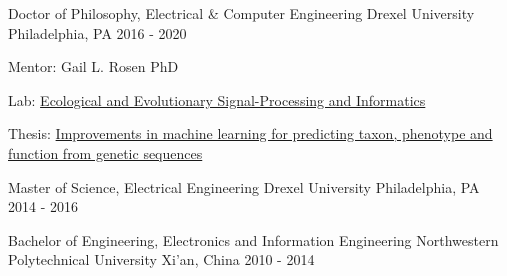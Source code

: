 

\begin{cventries}

  \cventry
    {Doctor of Philosophy, Electrical \& Computer Engineering} %
    {Drexel University} %
    {Philadelphia, PA} %
    {2016 - 2020} %
    {
      \begin{cvitems} %
         \item Mentor: Gail L. Rosen PhD
         \item Lab: \href{http://drexeleesi.com/}{Ecological and Evolutionary Signal-Processing and Informatics}
	 \item Thesis: \href{https://drexel.primo.exlibrisgroup.com/permalink/01DRXU_INST/1aqopv8/alma991014833048604721}{Improvements in machine learning for predicting taxon, phenotype and function from genetic sequences}
      \end{cvitems}
    }
    
  \cventry
    {Master of Science, Electrical Engineering} %
    {Drexel University} %
    {Philadelphia, PA} %
    {2014 - 2016} %
    {}
    
  \cventry
    {Bachelor of Engineering, Electronics and Information Engineering} %
    {Northwestern Polytechnical University} %
    {Xi'an, China} %
    {2010 - 2014} %
    {}

\end{cventries}
